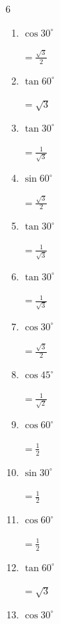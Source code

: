 \begin{multicols}{6}
\begin{enumerate}
        $\displaystyle =\sqrt{3}$

  \item $\displaystyle \cos{30^\circ}$

        $\displaystyle =\frac{\sqrt{3}}{2}$

  \item $\displaystyle \tan{60^\circ}$

        $\displaystyle =\sqrt{3}$

\columnbreak %

  \item $\displaystyle \tan{30^\circ}$

        $\displaystyle =\frac{1}{\sqrt{3}}$

  \item $\displaystyle \sin{60^\circ}$

        $\displaystyle =\frac{\sqrt{3}}{2}$

  \item $\displaystyle \tan{30^\circ}$

        $\displaystyle =\frac{1}{\sqrt{3}}$

  \item $\displaystyle \tan{30^\circ}$

        $\displaystyle =\frac{1}{\sqrt{3}}$

  \item $\displaystyle \cos{30^\circ}$

        $\displaystyle =\frac{\sqrt{3}}{2}$

  \item $\displaystyle \cos{45^\circ}$

        $\displaystyle =\frac{1}{\sqrt{2}}$

  \item $\displaystyle \cos{60^\circ}$

        $\displaystyle =\frac{1}{2}$

  \item $\displaystyle \sin{30^\circ}$

        $\displaystyle =\frac{1}{2}$

  \item $\displaystyle \cos{60^\circ}$

        $\displaystyle =\frac{1}{2}$

  \item $\displaystyle \tan{60^\circ}$

        $\displaystyle =\sqrt{3}$

  \item $\displaystyle \cos{30^\circ}$


\end{enumerate}
\end{multicols}
